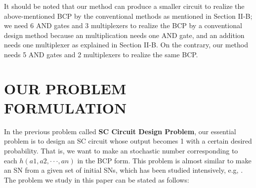 \documentclass[10pt,conference]{IEEEtran}
\begin{document}
\par
It should be noted that our method can produce a smaller
circuit to realize the above-mentioned BCP by the conventional
methods as mentioned in Section II-B; we need 6 AND gates
and 3 multiplexers to realize the BCP by a conventional design
method because an multiplication needs one AND gate, and an
addition needs one multiplexer as explained in Section II-B.
On the contrary, our method needs 5 AND gates and 2
multiplexers to realize the same BCP.

\section{ OUR PROBLEM FORMULATION}
\par
In the previous problem called \textbf{SC Circuit Design Problem},
our essential problem is to design an SC circuit whose output
becomes 1 with a certain desired probability. That is, we
want to make an stochastic number corresponding to each
$h(a1, a2, ··· , an)$ in the BCP form. This problem is almost
similar to make an SN from a given set of initial SNs, which
has been studied intensively, e.g, \cite{twelve}. The problem we study
in this paper can be stated as follows:
\end{document}
